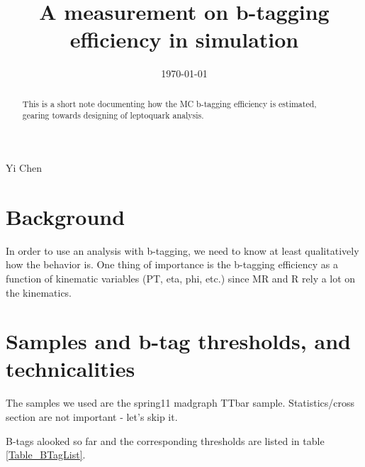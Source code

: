 \documentclass{fheadnote}
\begin{document}
\begin{titlepage}

   \date{\today}

   \title{A measurement on b-tagging efficiency in simulation}

   \begin{Authlist}
      Yi Chen
   \end{Authlist}


  \begin{abstract}
  This is a short note documenting how the MC b-tagging efficiency is estimated, gearing towards designing of leptoquark analysis.
  \end{abstract}

\end{titlepage}

\setcounter{page}{2}

\tableofcontents
\clearpage

\section{Background}

In order to use an analysis with b-tagging, we need to know at least qualitatively how the behavior is.
One thing of importance is the b-tagging efficiency as a function of kinematic variables (PT, eta, phi, etc.)
since MR and R rely a lot on the kinematics.


\section{Samples and b-tag thresholds, and technicalities}

The samples we used are the spring11 madgraph TTbar sample.  Statistics/cross section are not important - let's skip it.

B-tags alooked so far and the corresponding thresholds are listed in table \ref{Table_BTagList}.
\end{document}
